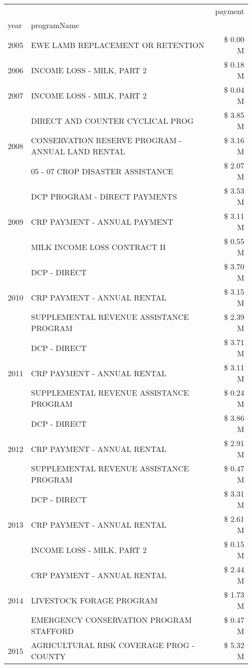 \begin{tabular}{llr}
\toprule
 &  & payment \\
year & programName &  \\
\midrule
2005 & EWE LAMB REPLACEMENT OR RETENTION & \$ 0.00 M \\
\cline{1-3}
2006 & INCOME LOSS - MILK, PART 2 & \$ 0.18 M \\
\cline{1-3}
2007 & INCOME LOSS - MILK, PART 2 & \$ 0.04 M \\
\cline{1-3}
\multirow[t]{3}{*}{2008} & DIRECT AND COUNTER CYCLICAL PROG & \$ 3.85 M \\
 & CONSERVATION RESERVE PROGRAM - ANNUAL LAND RENTAL & \$ 3.16 M \\
 & 05 - 07 CROP DISASTER ASSISTANCE & \$ 2.07 M \\
\cline{1-3}
\multirow[t]{3}{*}{2009} & DCP PROGRAM - DIRECT PAYMENTS & \$ 3.53 M \\
 & CRP PAYMENT - ANNUAL PAYMENT & \$ 3.11 M \\
 & MILK INCOME LOSS CONTRACT II & \$ 0.55 M \\
\cline{1-3}
\multirow[t]{3}{*}{2010} & DCP - DIRECT & \$ 3.70 M \\
 & CRP PAYMENT - ANNUAL RENTAL & \$ 3.15 M \\
 & SUPPLEMENTAL REVENUE ASSISTANCE PROGRAM & \$ 2.39 M \\
\cline{1-3}
\multirow[t]{3}{*}{2011} & DCP - DIRECT & \$ 3.71 M \\
 & CRP PAYMENT - ANNUAL RENTAL & \$ 3.11 M \\
 & SUPPLEMENTAL REVENUE ASSISTANCE PROGRAM & \$ 0.24 M \\
\cline{1-3}
\multirow[t]{3}{*}{2012} & DCP - DIRECT & \$ 3.86 M \\
 & CRP PAYMENT - ANNUAL RENTAL & \$ 2.91 M \\
 & SUPPLEMENTAL REVENUE ASSISTANCE PROGRAM & \$ 0.47 M \\
\cline{1-3}
\multirow[t]{3}{*}{2013} & DCP - DIRECT & \$ 3.31 M \\
 & CRP PAYMENT - ANNUAL RENTAL & \$ 2.61 M \\
 & INCOME LOSS - MILK, PART 2 & \$ 0.15 M \\
\cline{1-3}
\multirow[t]{3}{*}{2014} & CRP PAYMENT - ANNUAL RENTAL & \$ 2.44 M \\
 & LIVESTOCK FORAGE PROGRAM & \$ 1.73 M \\
 & EMERGENCY CONSERVATION PROGRAM STAFFORD & \$ 0.47 M \\
\cline{1-3}
\multirow[t]{3}{*}{2015} & AGRICULTURAL RISK COVERAGE PROG - COUNTY & \$ 5.32 M \\

\end{tabular}
